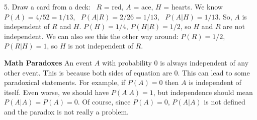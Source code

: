 5. Draw a card from a deck: \, $R$ = red, $A$ = ace, $H$ = hearts.
We know \, $P(A) = 4/52 = 1/13$, \, $P(A|R) = 2/26 = 1/13$, \, 
$P(A|H) = 1/13$.
So, $A$ is independent of $R$ and $H$.
$P(H) = 1/4$, $P(H|R) = 1/2$, so $H$ and  $R$ are not independent.
We can also see this the other way around:
$P(R) = 1/2$, $P(R|H) = 1$, so $H$ is not independent of $R$.

\bigskip

\textbf{Math Paradoxes}
An event $A$ with probability 0 is always independent of any other event.
This is because both sides of equation  are 0. This can lead to
some paradoxical statements. 
For example, if $P(A)=0$ then $A$ is independent of itself.
Even worse, we should have $P(A|A) = 1$, but independence should
mean $P(A|A) = P(A) = 0$. Of course, since $P(A) = 0$, $P(A|A)$ is not
defined and the paradox is not really a problem.


\endtopic

